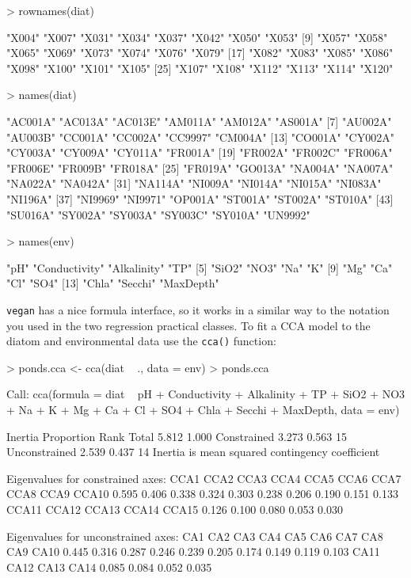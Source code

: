 \documentclass[a4paper,10pt]{article}
\newcommand{\cca}{\texttt{cca()}\xspace}
\newcommand{\vegan}{\texttt{vegan}\xspace}
\begin{document}
\begin{Schunk}
\begin{Sinput}
> rownames(diat)
\end{Sinput}
\begin{Soutput}
 [1] "X004" "X007" "X031" "X034" "X037" "X042" "X050" "X053"
 [9] "X057" "X058" "X065" "X069" "X073" "X074" "X076" "X079"
[17] "X082" "X083" "X085" "X086" "X098" "X100" "X101" "X105"
[25] "X107" "X108" "X112" "X113" "X114" "X120"
\end{Soutput}
\begin{Sinput}
> names(diat)
\end{Sinput}
\begin{Soutput}
 [1] "AC001A" "AC013A" "AC013E" "AM011A" "AM012A" "AS001A"
 [7] "AU002A" "AU003B" "CC001A" "CC002A" "CC9997" "CM004A"
[13] "CO001A" "CY002A" "CY003A" "CY009A" "CY011A" "FR001A"
[19] "FR002A" "FR002C" "FR006A" "FR006E" "FR009B" "FR018A"
[25] "FR019A" "GO013A" "NA004A" "NA007A" "NA022A" "NA042A"
[31] "NA114A" "NI009A" "NI014A" "NI015A" "NI083A" "NI196A"
[37] "NI9969" "NI9971" "OP001A" "ST001A" "ST002A" "ST010A"
[43] "SU016A" "SY002A" "SY003A" "SY003C" "SY010A" "UN9992"
\end{Soutput}
\begin{Sinput}
> names(env)
\end{Sinput}
\begin{Soutput}
 [1] "pH"           "Conductivity" "Alkalinity"   "TP"          
 [5] "SiO2"         "NO3"          "Na"           "K"           
 [9] "Mg"           "Ca"           "Cl"           "SO4"         
[13] "Chla"         "Secchi"       "MaxDepth"    
\end{Soutput}
\end{Schunk}

\vegan has a nice formula interface, so it works in a similar way to the notation you used in the two regression practical classes. To fit a CCA model to the diatom and environmental data use the \cca function:

\begin{Schunk}
\begin{Sinput}
> ponds.cca <- cca(diat ~ ., data = env)
> ponds.cca
\end{Sinput}
\begin{Soutput}
Call: cca(formula = diat ~ pH + Conductivity + Alkalinity
+ TP + SiO2 + NO3 + Na + K + Mg + Ca + Cl + SO4 + Chla +
Secchi + MaxDepth, data = env)

              Inertia Proportion Rank
Total           5.812      1.000     
Constrained     3.273      0.563   15
Unconstrained   2.539      0.437   14
Inertia is mean squared contingency coefficient 

Eigenvalues for constrained axes:
 CCA1  CCA2  CCA3  CCA4  CCA5  CCA6  CCA7  CCA8  CCA9 CCA10 
0.595 0.406 0.338 0.324 0.303 0.238 0.206 0.190 0.151 0.133 
CCA11 CCA12 CCA13 CCA14 CCA15 
0.126 0.100 0.080 0.053 0.030 

Eigenvalues for unconstrained axes:
  CA1   CA2   CA3   CA4   CA5   CA6   CA7   CA8   CA9  CA10 
0.445 0.316 0.287 0.246 0.239 0.205 0.174 0.149 0.119 0.103 
 CA11  CA12  CA13  CA14 
0.085 0.084 0.052 0.035 
\end{Soutput}
\end{Schunk}
\end{document}
